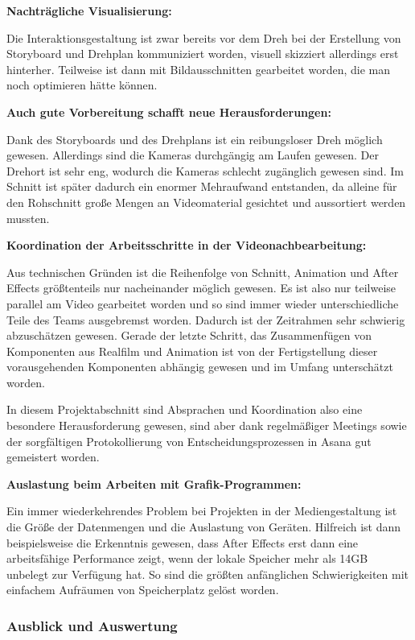 \textbf{Nachträgliche Visualisierung:}

Die Interaktionsgestaltung ist zwar bereits vor dem Dreh bei der
Erstellung von Storyboard und Drehplan kommuniziert worden, visuell
skizziert allerdings erst hinterher. Teilweise ist dann mit
Bildausschnitten gearbeitet worden, die man noch optimieren hätte
können.

\textbf{Auch gute Vorbereitung schafft neue Herausforderungen:}

Dank des Storyboards und des Drehplans ist ein reibungsloser Dreh
möglich gewesen. Allerdings sind die Kameras durchgängig am Laufen
gewesen. Der Drehort ist sehr eng, wodurch die Kameras schlecht
zugänglich gewesen sind. Im Schnitt ist später dadurch ein enormer
Mehraufwand entstanden, da alleine für den Rohschnitt große Mengen an
Videomaterial gesichtet und aussortiert werden mussten.

\textbf{Koordination der Arbeitsschritte in der Videonachbearbeitung:}

Aus technischen Gründen ist die Reihenfolge von Schnitt, Animation und
After Effects größtenteils nur nacheinander möglich gewesen. Es ist also
nur teilweise parallel am Video gearbeitet worden und so sind immer
wieder unterschiedliche Teile des Teams ausgebremst worden. Dadurch ist
der Zeitrahmen sehr schwierig abzuschätzen gewesen. Gerade der letzte
Schritt, das Zusammenfügen von Komponenten aus Realfilm und Animation
ist von der Fertigstellung dieser vorausgehenden Komponenten abhängig
gewesen und im Umfang unterschätzt worden.

In diesem Projektabschnitt sind Absprachen und Koordination also eine
besondere Herausforderung gewesen, sind aber dank regelmäßiger Meetings
sowie der sorgfältigen Protokollierung von Entscheidungsprozessen in
Asana gut gemeistert worden.

\textbf{Auslastung beim Arbeiten mit Grafik-Programmen:}

Ein immer wiederkehrendes Problem bei Projekten in der Mediengestaltung
ist die Größe der Datenmengen und die Auslastung von Geräten. Hilfreich
ist dann beispielsweise die Erkenntnis gewesen, dass After Effects erst
dann eine arbeitsfähige Performance zeigt, wenn der lokale Speicher mehr
als 14GB unbelegt zur Verfügung hat. So sind die größten anfänglichen
Schwierigkeiten mit einfachem Aufräumen von Speicherplatz gelöst worden.

\hypertarget{ausblick-und-auswertung}{%
\subsubsection{Ausblick und Auswertung}\label{ausblick-und-auswertung}}

